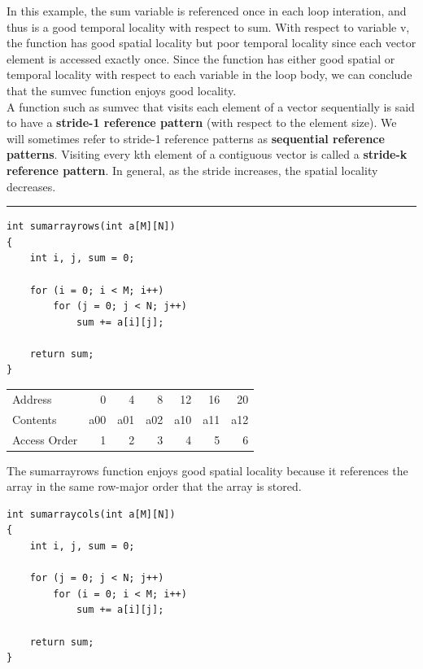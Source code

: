 \documentclass[11pt]{article}
\begin{document}
In this example, the sum variable is referenced once in each loop interation, and thus is a good temporal locality with respect to sum. With respect to variable v, the function has good spatial locality but poor temporal locality since each vector element is accessed exactly once. Since the function has either good spatial or temporal locality with respect to each variable in the loop body, we can conclude that the sumvec function enjoys good locality.\\


A function such as sumvec that visits each element of a vector sequentially is said to have a \textbf{stride-1 reference pattern} (with respect to the element size). We will sometimes refer to stride-1 reference patterns as \textbf{sequential reference patterns}. Visiting every kth element of a contiguous vector is called a \textbf{stride-k reference pattern}. In general, as the stride increases, the spatial locality decreases.\\

\noindent\rule{\textwidth}{0.5pt}

\begin{verbatim}
int sumarrayrows(int a[M][N])
{
    int i, j, sum = 0;

    for (i = 0; i < M; i++)
        for (j = 0; j < N; j++)
            sum += a[i][j];

    return sum;
}
\end{verbatim}

\begin{center}
\begin{tabular}{lrrrrrr}
Address & 0 & 4 & 8 & 12 & 16 & 20\\
Contents & a00 & a01 & a02 & a10 & a11 & a12\\
Access Order & 1 & 2 & 3 & 4 & 5 & 6\\
\end{tabular}
\end{center}

The sumarrayrows function enjoys good spatial locality because it references the array in the same row-major order that the array is stored.\\

\begin{verbatim}
int sumarraycols(int a[M][N])
{
    int i, j, sum = 0;

    for (j = 0; j < N; j++)
        for (i = 0; i < M; i++)
            sum += a[i][j];

    return sum;
}
\end{verbatim}
\end{document}
